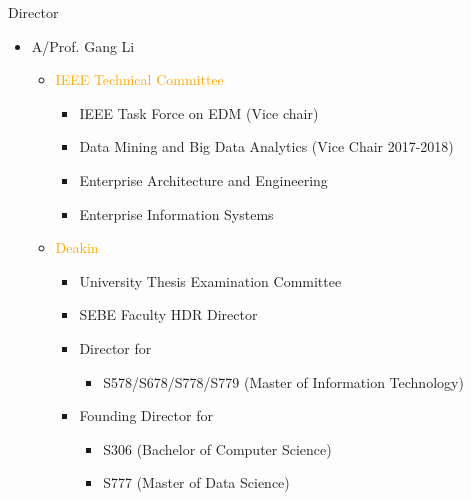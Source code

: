 \documentclass[
 size=14pt,
 paper=smartboard,  %
 mode=present, 		%
 display=slides, 	%
 style=tuliplab,  	%
 pauseslide,
 fleqn,leqno]{powerdot}
\begin{document}
\begin{slide}{Director}
    \begin{itemize}
      \item A/Prof. Gang Li
      \begin{itemize}
        \item \textcolor{orange}{IEEE Technical Committee}
         \begin{itemize}
           \item IEEE Task Force on EDM (Vice chair)
           \item Data Mining and Big Data Analytics (Vice Chair 2017-2018)
           \item Enterprise Architecture and Engineering
           \item Enterprise Information Systems
         \end{itemize}
        \item \textcolor{orange}{Deakin}
          \begin{itemize}
            \item University Thesis Examination Committee
            \item SEBE Faculty HDR Director
            \item Director for
                \begin{itemize}
                  \item S578/S678/S778/S779 (Master of Information Technology)
                \end{itemize}
            \item Founding Director for
                \begin{itemize}
                  \item S306 (Bachelor of Computer Science)
                  \item S777 (Master of Data Science)
                \end{itemize}
          \end{itemize}
      \end{itemize}
    \end{itemize}
\end{slide}
\end{document}
